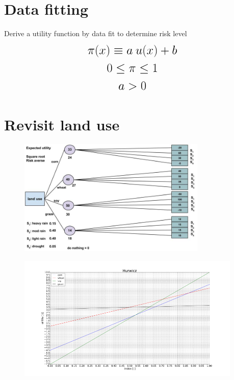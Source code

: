 \documentclass[aspectratio=1610,pdftex,dvipsnames,compress,xcolor={dvipsnames}]{beamer}
\begin{document}
\section{Data fitting}


\addtocounter{framenumber}{-1}
\begin{frame}{Derive a utility function by data fit to determine risk level}
    \begin{equation}
        \LARGE
        \begin{gathered}
            \pi(x) \equiv a \: u(x) + b\\
            0 \leq \pi \leq 1 \\
            a > 0
        \end{gathered}
    \end{equation}
\end{frame}


\section{Revisit land use}


\addtocounter{framenumber}{-1}
\begin{frame}{}
    \begin{figure}
        \centering
        \includegraphics[width=0.80\textwidth]{decision.tree_risk.averse.jpg}
    \end{figure}
\end{frame}


\begin{frame}{}
    \begin{figure}
        \centering
        \includegraphics[width=0.95\textwidth]{hurwicz_risk.averse.jpg}
    \end{figure}
\end{frame}
\end{document}
